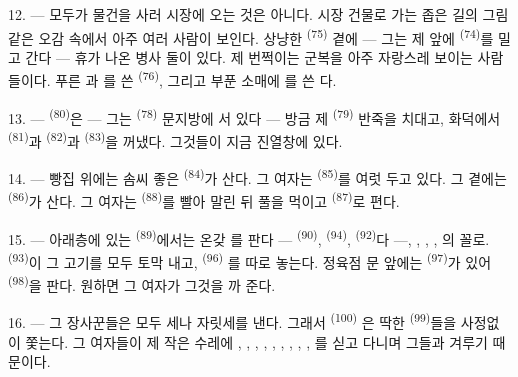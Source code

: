 \VUsaut{4.0mm}
\VUsaut{3.0mm}

12. --- 모두가 물건을 사러 시장에 오는 것은 아니다. 시장 건물로 가는 좁은 길의 그림 같은
오감 속에서 아주 여러 사람이 보인다. 상냥한  \textsuperscript{(75)}
곁에 — 그는 제 앞에  \textsuperscript{(74)}를 밀고 간다 — 휴가 나온 병사
둘이 있다. 제 번쩍이는 군복을 아주 자랑스레 보이는 사람들이다. 푸른 과
를 쓴  \textsuperscript{(76)}, 그리고 부푼 소매에
를 쓴 다.

13. ---  \textsuperscript{(80)}은 — 그는  \textsuperscript{(78)}
문지방에 서 있다 — 방금 제  \textsuperscript{(79)} 반죽을 치대고, 화덕에서
 \textsuperscript{(81)}과  \textsuperscript{(82)}과
 \textsuperscript{(83)}을 꺼냈다. 그것들이 지금 진열창에 있다.

14. --- 빵집 위에는 솜씨 좋은  \textsuperscript{(84)}가 산다. 그
여자는  \textsuperscript{(85)}를 여럿 두고 있다. 그 곁에는
 \textsuperscript{(86)}가 산다. 그 여자는 
\textsuperscript{(88)}를 빨아 말린 뒤 풀을 먹이고  \textsuperscript{(87)}로
편다.

\VUsaut{4.0mm}
\VUsaut{3.0mm}

15. --- 아래층에 있는  \textsuperscript{(89)}에서는 온갖 를
판다 —  \textsuperscript{(90)},  \textsuperscript{(94)},
 \textsuperscript{(92)}다 —, ,
, , 의 꼴로. 
\textsuperscript{(93)}이 그 고기를 모두 토막 내고,  \textsuperscript{(96)}
를 따로 놓는다. 정육점 문 앞에는  \textsuperscript{(97)}가 있어
 \textsuperscript{(98)}을 판다. 원하면 그 여자가 그것을 까 준다.

16. --- 그 장사꾼들은 모두 세나 자릿세를 낸다. 그래서  \textsuperscript{(100)}
은 딱한  \textsuperscript{(99)}들을 사정없이 쫓는다. 그 여자들이
제 작은 수레에 , , , ,
, , , ,
, 를 싣고 다니며 그들과 겨루기 때문이다.

